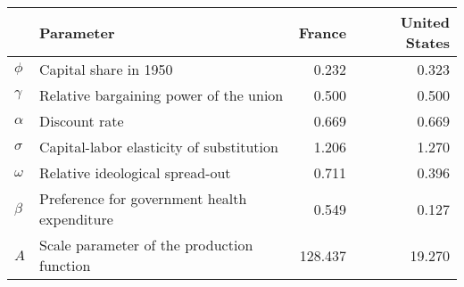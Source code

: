 
\begin{tabular}{llrr}
\toprule
\textbf{} & \textbf{Parameter} & \textbf{France} & \textbf{United States}\\
\midrule
$\phi$ & Capital share in 1950 & 0.232 & 0.323\\
$\gamma$ & Relative bargaining power of the union & 0.500 & 0.500\\
$\alpha$ & Discount rate & 0.669 & 0.669\\
$\sigma$ & Capital-labor elasticity of substitution & 1.206 & 1.270\\
$\omega$ & Relative ideological spread-out & 0.711 & 0.396\\
$\beta$ & Preference for government health expenditure & 0.549 & 0.127\\
$A$ & Scale parameter of the production function & 128.437 & 19.270\\
\bottomrule
\end{tabular}
